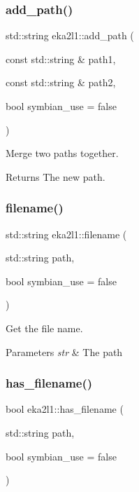 \subsubsection{\texorpdfstring{add\+\_\+path()}{add\_path()}}
{\footnotesize\ttfamily std\+::string eka2l1\+::add\+\_\+path (\begin{DoxyParamCaption}\item[{const std\+::string \&}]{path1,  }\item[{const std\+::string \&}]{path2,  }\item[{bool}]{symbian\+\_\+use = {\ttfamily false} }\end{DoxyParamCaption})}



Merge two paths together. 

\begin{DoxyReturn}{Returns}
The new path. 
\end{DoxyReturn}
\mbox{\label{namespaceeka2l1_a17ab604e5b9c2849d36eb62e98214378}} 
\subsubsection{\texorpdfstring{filename()}{filename()}}
{\footnotesize\ttfamily std\+::string eka2l1\+::filename (\begin{DoxyParamCaption}\item[{std\+::string}]{path,  }\item[{bool}]{symbian\+\_\+use = {\ttfamily false} }\end{DoxyParamCaption})}



Get the file name. 


\begin{DoxyParams}{Parameters}
{\em str} & The path \\
\hline
\end{DoxyParams}
\mbox{\label{namespaceeka2l1_a2c45a9774d5cd66fd88e4aa019b05486}} 
\subsubsection{\texorpdfstring{has\+\_\+filename()}{has\_filename()}}
{\footnotesize\ttfamily bool eka2l1\+::has\+\_\+filename (\begin{DoxyParamCaption}\item[{std\+::string}]{path,  }\item[{bool}]{symbian\+\_\+use = {\ttfamily false} }\end{DoxyParamCaption})}




